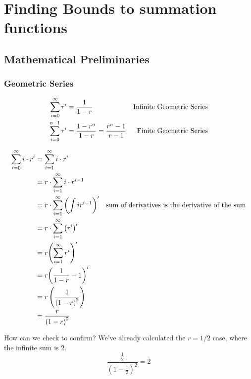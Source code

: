 \documentclass[english, 10pt]{article}
\begin{document}
\section{Finding Bounds to summation functions}
\subsection{Mathematical Preliminaries}
\subsubsection{Geometric Series}
\begin{align*}
    \sum_{i=0}^{\infty}r^{i} &= \frac{1}{1-r} & \text{Infinite Geometric Series}\\
    \sum_{i=0}^{n-1}r^{i} &= \frac{1-r^{n}}{1-r} = \frac{r^n -1}{r-1} & \text{Finite Geometric Series}\\
\end{align*}

\begin{align*}
    \sum_{i=0}^{\infty}i\cdot r^{i} &= \sum_{i=1}^{\infty}i\cdot r^{i} \\
    &= r\cdot\sum_{i=1}^{\infty}i\cdot r^{i-1} \\
    &= r\cdot\sum_{i=1}^{\infty}{\left( \int ir^{i-1} \right)}^{\prime} & \text{sum of derivatives is the derivative of the sum}\\
    &= r\cdot\sum_{i=1}^{\infty}{\left( r^i \right)}^{\prime} \\
    &= r{\left(\sum_{i=1}^{\infty} r^i \right)}^{\prime} \\
    &= r{\left( \frac{1}{1-r}-1 \right)}^{\prime} \\
    &= r\left( \frac{1}{{\left( 1-r \right)}^{2}} \right) \\
    &= \frac{r}{{\left( 1-r \right)}^2}
\end{align*}

How can we check to confirm? We've already calculated the $r=1/2$ case, where the infinite sum is 2.
$$ \frac{\frac{1}{2}}{{\left( 1-\frac{1}{2} \right)}^2} =2$$
\end{document}
